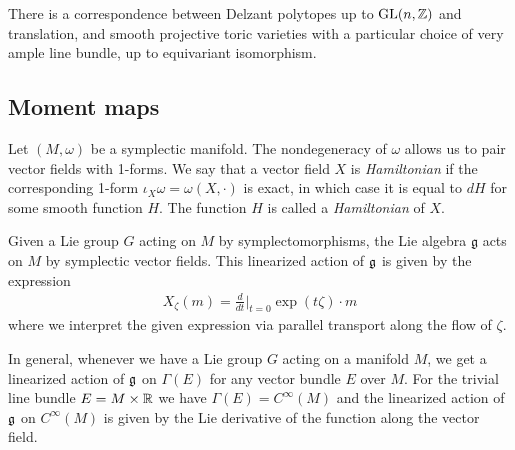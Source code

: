 \begin{theorem}
    There is a correspondence between Delzant polytopes up to $\operatorname{GL}(n,\mathbb{Z})$
    and translation, and smooth projective toric varieties with a particular choice
    of very ample line bundle, up to equivariant isomorphism.
\end{theorem}

\subsection{Moment maps}
Let $(M,\omega)$ be a symplectic manifold. The nondegeneracy of $\omega$ allows us to
pair vector fields with 1-forms. We say that a vector field $X$ is \emph{Hamiltonian} if
the corresponding 1-form $\iota_X\omega = \omega(X,\cdot)$ is exact, in which case 
it is equal to $dH$ for some smooth function $H$. The function $H$ is called a
\emph{Hamiltonian} of $X$. 

\hfill

Given a Lie group $G$ acting on $M$ by symplectomorphisms,
the Lie algebra $\mathfrak{g}$ acts on $M$ by symplectic vector fields.
This linearized action of $\mathfrak{g}$ is given by the expression
\begin{align*}
    X_\zeta(m) = \frac{d}{dt}\Big|_{t=0} \exp(t\zeta)\cdot m
\end{align*} where we interpret the given expression via parallel transport along the flow of $\zeta$.

\begin{remark}
    In general, whenever we have a Lie group $G$ acting on a manifold $M$, we get a linearized
    action of $\mathfrak{g}$ on $\Gamma(E)$ for any vector bundle $E$ over $M$. For the trivial 
    line bundle $E = M\times \mathbb{R}$ we have $\Gamma(E) = C^\infty(M)$ and the linearized action
    of $\mathfrak{g}$ on $C^\infty(M)$ is given by the Lie derivative of 
    the function along the vector field.
\end{remark}

